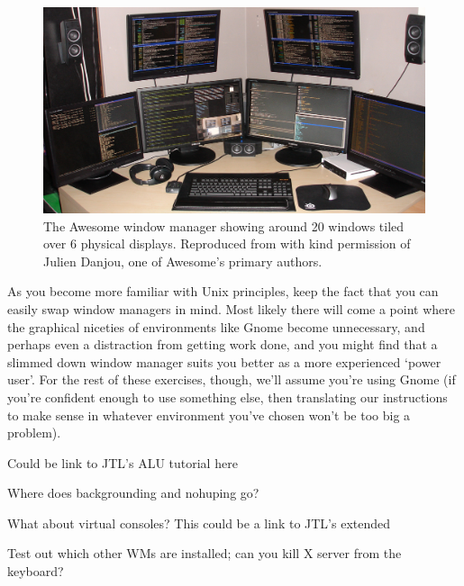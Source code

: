 \begin{figure}[htb]
  \begin{center}
    \includegraphics[width=14cm]{images/awesome.png}
  \end{center}
\caption{The Awesome window manager showing around 20 windows tiled over 6 physical displays. Reproduced from  with kind permission of Julien Danjou, one of Awesome's primary authors.}
\label{figure:awesome}
\end{figure}

As you become more familiar with Unix principles, keep the fact that you can easily swap window managers in mind. Most likely there will come a point where the graphical niceties of environments like Gnome become unnecessary, and perhaps even a distraction from getting work done, and you might find that a slimmed down window manager suits you better as a more experienced `power user'. For the rest of these exercises, though, we'll assume you're using Gnome (if you're confident enough to use something else, then translating our instructions to make sense in whatever environment you've chosen won't be too big a problem). 

\begin{note}
Could be link to JTL's ALU tutorial here
\end{note}


\begin{note}
Where does backgrounding and nohuping go?
\end{note}

\begin{note}
What about virtual consoles? This could be a link to JTL's extended 
\end{note}

\begin{note}
Test out which other WMs are installed; can you kill X server from the keyboard?
\end{note}

